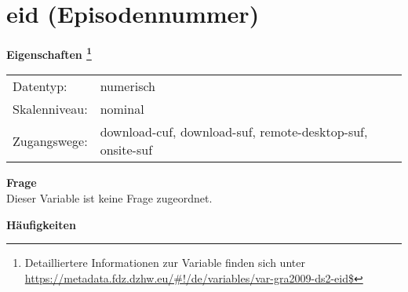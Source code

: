 
    \setcounter{footnote}{0}

    \vspace*{-1.8cm}
	\section{eid (Episodennummer)}
	\label{section:eid}



    \vspace*{0.5cm}
    \noindent\textbf{Eigenschaften
	\footnote{Detailliertere Informationen zur Variable finden sich unter
		\url{https://metadata.fdz.dzhw.eu/\#!/de/variables/var-gra2009-ds2-eid$}}}\\
	\begin{tabularx}{\hsize}{@{}lX}
	Datentyp: & numerisch \\
	Skalenniveau: & nominal \\
	Zugangswege: &
	  download-cuf, 
	  download-suf, 
	  remote-desktop-suf, 
	  onsite-suf
 \\
    \end{tabularx}



		\vspace*{0.5cm}
		\noindent\textbf{Frage}\\
		Dieser Variable ist keine Frage zugeordnet.





        		\vspace*{0.5cm}
                \noindent\textbf{Häufigkeiten}

